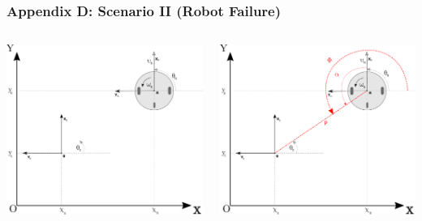 	\begin{frame}
		\frametitle{Appendix D: Scenario \textrm{II} (Robot Failure)}\label{d}
		\begin{columns}[T]
			\begin{column}{0.49\textwidth}
				\centering
				\includegraphics[scale=0.35]{pictures/robot_config_cart_mi.pdf}
			\end{column}
			\begin{column}{0.49\textwidth}
				\pause
				\centering
				\includegraphics[scale=0.35]{pictures/robot_config_polar_mi.pdf}
			\end{column}
		\end{columns}
	\end{frame}
	
